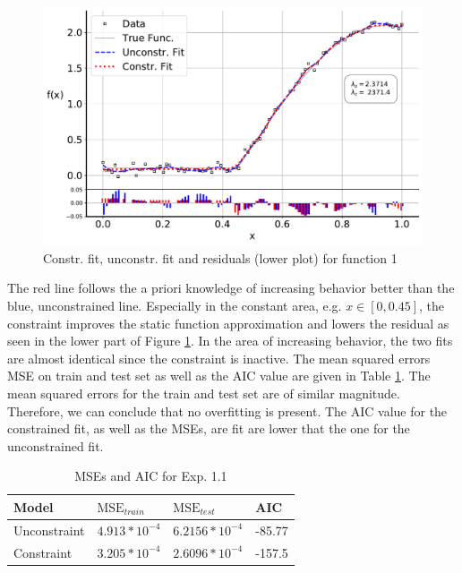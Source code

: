 \documentclass[10pt,a4paper]{article}
\begin{document}
\begin{figure}[H]
	\centering
	\includegraphics[width=\columnwidth]{../thesisplots/exp_inc1_fit.pdf}
	\caption{Constr. fit, unconstr. fit and residuals (lower plot) for function 1}
	\label{fig:test_func_1_fit}
\end{figure}

The red line follows the a priori knowledge of increasing behavior better than the blue, unconstrained line. Especially in the constant area, e.g. $x \in  [0, 0.45]$, the constraint improves the static function approximation and lowers the residual as seen in the lower part of Figure \ref{fig:test_func_1_fit}. In the area of increasing behavior, the two fits are almost identical since the constraint is inactive. The mean squared errors MSE on train and test set as well as the AIC value are given in Table \ref{tab:metrics_1-1}. The mean squared errors for the train and test set are of similar magnitude. Therefore, we can conclude that no overfitting is present. The AIC value for the constrained fit, as well as the MSEs, are fit are lower that the one for the unconstrained fit. 

\begin{table}[h]
	\centering
	\begin{tabular}{|l|l|l|l|}
		\hline
		\textbf{Model} & \textbf{$\text{MSE}_{train}$} & \textbf{$\text{MSE}_{test}$}  & \textbf{AIC} \\ \hline \toprule
		Unconstraint   & $4.913 * 10^{-4}$  & $6.2156 * 10^{-4}$ & -85.77       \\ \hline
		Constraint     & $3.205* 10^{-4}$   & $2.6096 * 10^{-4}$ & -157.5       \\ \hline \bottomrule
	\end{tabular}
	\caption{MSEs and AIC for Exp. 1.1}
	\label{tab:metrics_1-1}
\end{table}
\end{document}
